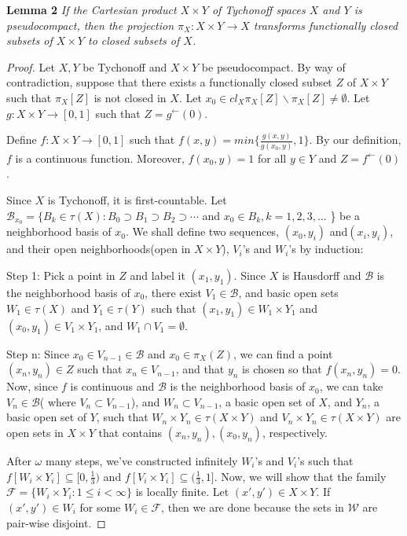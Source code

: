 \documentclass{amsart}
\begin{document}
\textbf{Lemma 2}
\emph{If the Cartesian product $X\times Y$ of Tychonoff spaces $X$ and $Y$ is pseudocompact, then the projection $\pi_X: X\times Y \rightarrow X$ transforms functionally closed subsets of $X \times Y$ to closed subsets of $X$.}
\begin{proof}
Let $X, Y$ be Tychonoff and $X\times Y$ be pseudocompact. By way of contradiction, suppose that there exists a functionally closed subset $Z$ of $X \times Y$ such that $\pi_X[Z]$ is not closed in $X$. Let $x_0\in cl_X \pi_X[Z] \backslash \pi_X[Z] \neq \emptyset$. Let $g:X\times Y \rightarrow [0,1] $ such that $Z=g^\leftarrow(0)$.

Define $f:X\times Y \rightarrow [0,1] $ such that $f(x,y)=min\{\frac{g(x,y)}{g(x_0,y)},1\}.$
By our definition, $f$ is a continuous function. Moreover, $f(x_0,y)=1 $ for all $y\in Y$ and $Z=f^\leftarrow(0)$.

Since $X$ is Tychonoff, it is first-countable. Let $\mathcal{B}_{x_0}=\{B_k \in \tau(X): 
B_0 \supset B_1 \supset B_2 \supset \cdots $ and $x_0 \in B_k, k=1,2,3,...$ \} be a neighborhood basis of $x_0$.   We shall define two sequences, $(x_0, y_{i})$ and$ (x_i,y_i)$, and their open neighborhoods(open in $X\times Y$), $V_i$'s and $W_i$'s by induction: 

Step 1:  
Pick a point in $Z$ and label it $(x_1,y_1)$. 
Since $X$ is Hausdorff and $\mathcal{B}$ is the neighborhood basis of $x_0$, there exist $V_1 \in \mathcal{B}$, and basic open sets $W_1 \in \tau(X)$ and $Y_1 \in \tau(Y)$ such that  $(x_1,y_1) \in W_1\times Y_1$ and $(x_0,y_1)\in V_1\times Y_1 $, and $W_1 \cap V_1 = \emptyset$. 

Step n: Since $x_0 \in V_{n-1}\in \mathcal{B}$ and $x_0 \in \pi_X(Z)$, we can find a
point $(x_n, y_n) \in Z$ such that $x_n \in V_{n-1}$, and that $y_n$ is chosen so that $f(x_n, y_n)=0$. 
Now, since $f$ is continuous and $\mathcal{B}$ is the neighborhood basis of $x_0$, we can take  $V_n \in \mathcal{B}$( where $V_n \subset V_{n-1}$),  and $W_n \subset V_{n-1}$, a basic open set of $X$, and $Y_n$, a basic open set of $Y$, such that $W_n \times Y_n \in \tau(X\times Y)$ and $V_n \times Y_n \in \tau(X\times Y)$ are open sets in $X\times Y$ that contains $(x_n,y_n), (x_0,y_n)$, respectively. 


After $\omega $ many steps, we've constructed infinitely $W_i$'s and $V_i$'s such that $f[W_i\times Y_i]\subseteq [0,\frac{1}{3})$ and $f[V_i\times Y_i]\subseteq (\frac{1}{3},1]$. 
Now, we will show that the family $\mathcal{F}=\{W_i\times Y_i: 1\leq i < \infty\} $ is locally finite. 
Let $(x',y')\in X\times Y$. If $(x',y')\in W_i$ for some $W_i \in \mathcal{F}$, then we are done because the sets in $\mathcal{W}$ are pair-wise disjoint. 


\end{proof}
\end{document}
